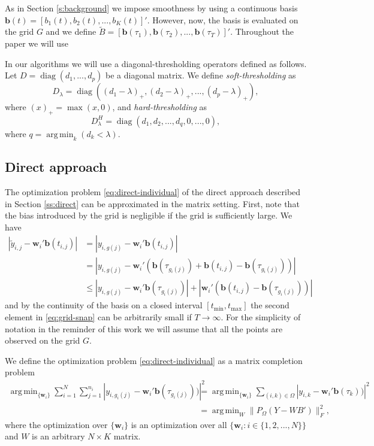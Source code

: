 \documentclass[preprint]{imsart}
\numberwithin{equation}{section}
\theoremstyle{plain}
\newcommand{\bb}{\mathbf{b}}
\newcommand{\bw}{\mathbf{w}}
\DeclareMathOperator*{\argmin}{arg\,min}
\DeclareMathOperator*{\diag}{diag}
\begin{document}
As in Section \ref{s:background} we impose smoothness by using a continuous basis $\bb(t) = [b_1(t),b_2(t),...,b_K(t)]'$. However, now, the basis is evaluated on the grid $G$ and we define $\tilde{B} = [\bb(\tau_1),\bb(\tau_2),...,\bb(\tau_T)]'$. Throughout the paper we will use 

In our algorithms we will use a diagonal-thresholding operators defined as follows. Let $D = \diag(d_1,...,d_p)$ be a diagonal matrix. We define {\em soft-thresholding} as
\begin{equation*}
D_\lambda = \diag((d_1 - \lambda)_+,(d_2 - \lambda)_+,...,(d_p - \lambda)_+),\label{eq:thresholding}
\end{equation*}
where $(x)_+ = \max(x, 0)$, and {\em hard-thresholding} as
\begin{equation*}
D_\lambda^H = \diag(d_1,d_2,...,d_q,0,...,0),\label{eq:thresholding}
\end{equation*}
where $q = \argmin_k(d_k < \lambda)$.

\subsection{Direct approach}\label{ss:direct-matrix}

The optimization problem \eqref{eq:direct-individual} of the direct approach described in Section \ref{ss:direct} can be approximated in the matrix setting. First, note that the bias introduced by the grid is negligible if the grid is sufficiently large. We have
\begin{align}
  \left|\tilde y_{i,j} - \bw_i'\bb(t_{i,j})\right| &= \left|y_{i,g(j)} - \bw_i'\bb(t_{i,j})\right|\nonumber\\
  &= \left| y_{i,g(j)} - \bw_i' (\bb (\tau_{g_i(j)}) + \bb (t_{i,j}) - \bb (\tau_{g_i(j)}))\right|\nonumber\\
  &\leq \left| y_{i,g(j)} - \bw_i' \bb(\tau_{g_i(j)})\right| + \left|\bw_i' (\bb(t_{i,j}) - \bb(\tau_{g_i(j)}))\right|\label{eq:grid-snap}
\end{align}
and by the continuity of the basis on a closed interval $[t_{\min},t_{\max}]$ the second element in \eqref{eq:grid-snap} can be arbitrarily small if $T \rightarrow \infty$. For the simplicity of notation in the reminder of this work we will assume that all the points are observed on the grid $G$.  %

We define the optimization problem \eqref{eq:direct-individual} as a matrix completion problem
\begin{align}
 \argmin_{\{\bw_i\}}\sum_{i=1}^N \sum_{j=1}^{n_i}\left|y_{i,g_i(j)} - \bw_i' \bb(\tau_{g_i(j)}))\right|^2 &= \argmin_{\{\bw_i\}}\sum_{(i,k) \in \Omega}\left|y_{i,k} - \bw_i' \bb(\tau_{k}))\right|^2\nonumber\\
&= \argmin_W \| P_\Omega(Y - WB') \|_F^2,\label{eq:direct-matrix}
\end{align}
where the optimization over $\{\bw_i\}$ is an optimization over all $\{\bw_i : i \in \{ 1,2,...,N \}\}$ and $W$ is an arbitrary $N \times K$ matrix.
\end{document}
